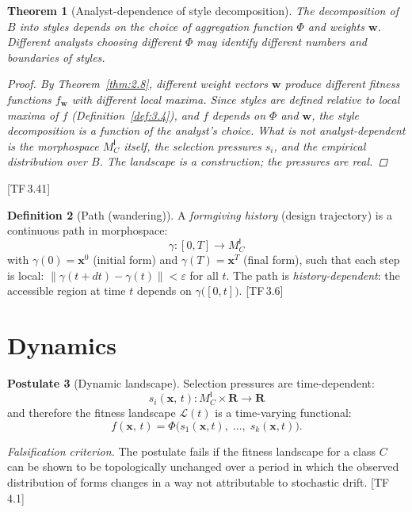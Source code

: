 \documentclass[11pt, a4paper]{article}
\theoremstyle{definition}
\newtheorem{definition}{Definition}[section]
\newtheorem{postulate}[definition]{Postulate}
\theoremstyle{plain}
\newtheorem{theorem}[definition]{Theorem}
\theoremstyle{remark}
\newcommand{\MC}{M^{\mathsf{I}}_C}          %
\providecommand{\R}{}
\renewcommand{\R}{\mathbf{R}}               %
\newcommand{\FitLand}{\mathcal{L}}           %
\newcommand{\norm}[1]{\lVert #1 \rVert}
\newcommand{\TF}[1]{\textnormal{[TF\,#1]}}  %
\begin{document}
\begin{theorem}[Analyst-dependence of style decomposition]\label{thm:3.5}
The decomposition of $B$ into styles depends on the choice of
aggregation function $\Phi$ and weights $\bm{w}$. Different analysts
choosing different $\Phi$ may identify different numbers and boundaries
of styles.

\begin{proof}
By Theorem~\ref{thm:2.8}, different weight vectors $\bm{w}$ produce
different fitness functions $f_{\bm{w}}$ with different local maxima.
Since styles are defined relative to local maxima of $f$
(Definition~\ref{def:3.4}), and $f$ depends on $\Phi$ and $\bm{w}$,
the style decomposition is a function of the analyst's choice.
What is \emph{not} analyst-dependent is the morphospace $\MC$ itself,
the selection pressures $s_i$, and the empirical distribution over $B$.
The landscape is a construction; the pressures are real. \qedhere
\end{proof}
\end{theorem}

\TF{3.41}

\begin{definition}[Path (wandering)]\label{def:3.6}
A \emph{formgiving history} (design trajectory) is a continuous path
in morphospace:
\[
  \gamma : [0, T] \longrightarrow \MC
\]
with $\gamma(0) = \bm{x}^0$ (initial form) and $\gamma(T) = \bm{x}^T$
(final form), such that each step is local:
$\norm{\gamma(t + dt) - \gamma(t)} < \varepsilon$ for all $t$.
The path is \emph{history-dependent}: the accessible region at time $t$
depends on $\gamma\bigl([0, t]\bigr)$. \TF{3.6}
\end{definition}


\newpage
\section{Dynamics}\label{sec:dynamics}

\begin{postulate}[Dynamic landscape]\label{post:4.1}
Selection pressures are time-dependent:
\[
  s_i(\bm{x},\, t) : \MC \times \R \longrightarrow \R
\]
and therefore the fitness landscape $\FitLand(t)$ is a time-varying
functional:
\[
  f(\bm{x},\, t) = \Phi\bigl(s_1(\bm{x}, t),\; \ldots,\;
  s_k(\bm{x}, t)\bigr).
\]

\medskip\noindent
\textit{Falsification criterion.}
The postulate fails if the fitness landscape for a class $C$ can be
shown to be topologically unchanged over a period in which the observed
distribution of forms changes in a way not attributable to stochastic
drift. \TF{4.1}
\end{postulate}
\end{document}
